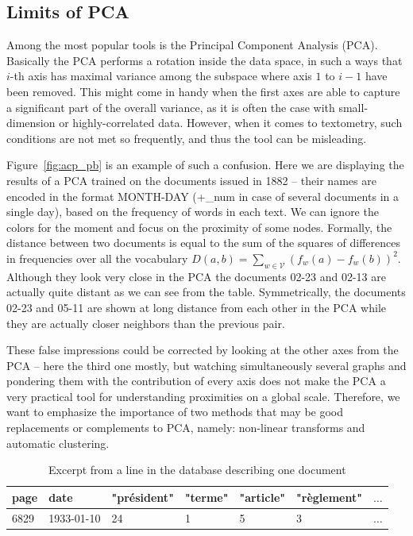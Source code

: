 \documentclass[a4paper,11pt]{article}
\begin{document}
\subsection*{Limits of PCA}

Among the most popular tools is the Principal Component Analysis (PCA). Basically the PCA performs a rotation inside the data space, in such a ways that $i$-th axis has maximal variance among the subspace where axis $1$ to $i-1$ have been removed. This might come in handy when the first axes are able to capture a significant part of the overall variance, as it is often the case with small-dimension or highly-correlated data. However, when it comes to textometry, such conditions are not met so frequently, and thus the tool can be misleading.

Figure~\ref{fig:acp_pb} is an example of such a confusion. Here we are displaying the results of a PCA trained on the documents issued in 1882 -- their names are encoded in the format MONTH-DAY (+\_num in case of several documents in a single day), based on the frequency of words in each text. We can ignore the colors for the moment and focus on the proximity of some nodes. Formally, the distance between two documents is equal to the sum of the squares of differences in frequencies over all the vocabulary $D(a,b) = \sum_{w \in \mathcal{V}} (f_w(a)-f_w(b))^2$. Although they look very close in the PCA the documents 02-23 and 02-13 are actually quite distant as we can see from the table. Symmetrically, the documents 02-23 and 05-11 are shown at long distance from each other in the PCA while they are actually closer neighbors than the previous pair.

These false impressions could be corrected by looking at the other axes from the PCA -- here the third one mostly, but watching simultaneously several graphs and pondering them with the contribution of every axis does not make the PCA a very practical tool for understanding proximities on a global scale. Therefore, we want to emphasize the importance of two methods that may be good replacements or complements to PCA, namely: non-linear transforms and automatic clustering.

\begin{table}
\begin{tabular}{|l|l|l|l|l|l|l|}
\hline
page & date &  "président" & "terme" &  "article" & "règlement" & $\ldots$ \\
\hline
6829 & 1933-01-10 & 24 & 1 & 5 & 3 & $\ldots$\\
\hline
\end{tabular}
\caption{Excerpt from a line in the database describing one document}
\label{exdata}
\end{table}
\end{document}
